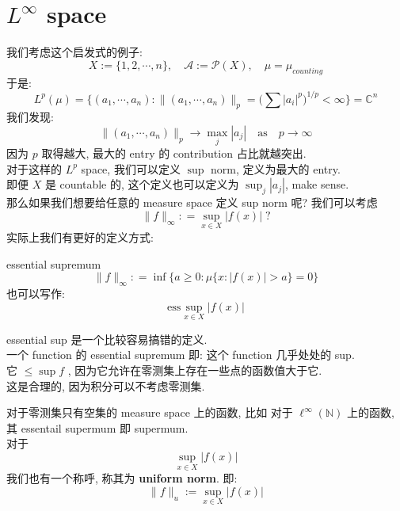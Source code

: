 \documentclass[lang=cn,11pt]{elegantbook}
\begin{document}
\section{$L^\infty$ space}
我们考虑这个启发式的例子: \[
X := \{ 1,2,\cdots, n\},\quad\mathcal{A} := \mathcal{P}(X),\quad \mu = \mu_{counting}
\]
于是: \[
L^p (\mu)   = \{(a_1,\cdots, a_n) : \| (a_1,\cdots, a_n) \|_p = \big( \sum |a_i|^p \big)^{1/p} < \infty\}= \mathbb{C}^n
\]
我们发现: \[
\| (a_1,\cdots, a_n) \|_p \to \max_j |a_j| \quad \text{as}\quad p\to \infty
\]
因为 $p$ 取得越大, 最大的 entry 的 contribution 占比就越突出.\\
对于这样的 $L^p$ space, 我们可以定义 $\sup$ norm, 定义为最大的 entry.\\
即便 $X$ 是 countable 的, 这个定义也可以定义为 $\sup_j |a_j|$, make sense.\\
那么如果我们想要给任意的 measure space 定义 sup norm 呢? 我们可以考虑 \[
\| f\|_\infty : = \sup_{x\in X} |f(x)| \; ?
\]
实际上我们有更好的定义方式: 

\begin{definition}{essential supremum}  \[
    \| f\|_\infty : = \inf \{ a\geq 0 : \mu\{x:|f(x)|>a\}  = 0 \}
    \]
    也可以写作: \[
    \text{ess} \sup_{x\in X} |f(x)|
    \]
\end{definition}
\begin{remark}
essential sup 是一个比较容易搞错的定义. \\
一个 function 的 essential supremum 即: 这个 function 几乎处处的 sup.\\
它 $\leq \sup f$ , 因为它允许在零测集上存在一些点的函数值大于它.\\
这是合理的, 因为积分可以不考虑零测集.\\
\end{remark}
\begin{remark}
  对于零测集只有空集的 measure space 上的函数, 比如  对于 $\ell^\infty(\mathbb{N})$ 上的函数, 其 essentail supermum 即 supermum.\\
  对于\[
   \sup_{x\in X} |f(x)| 
  \]我们也有一个称呼, 称其为 \textbf{uniform norm}. 即: \[
\|f\|_u :=   \sup_{x\in X} |f(x)| 
  \]
\end{remark}
\end{document}
